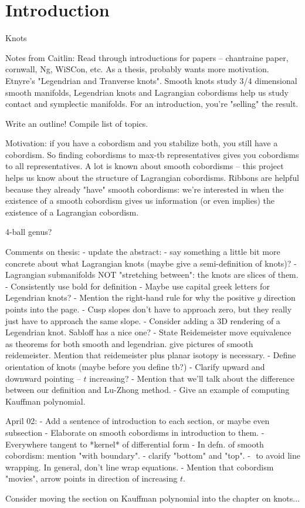 \chapter{Introduction}
Knots

Notes from Caitlin:
Read through introductions for papers -- chantraine paper, cornwall, Ng, WiSCon, etc.
As a thesis, probably wants more motivation. Etnyre's "Legendrian and Tranverse knots".
Smooth knots study 3/4 dimensional smooth manifolds, Legendrian knots and Lagrangian cobordisms help us study contact and symplectic manifolds. 
For an introduction, you're "selling" the result.

Write an outline!
Compile list of topics. 

Motivation: if you have a cobordism and you stabilize both, you still have a cobordism. So finding cobordisms to max-tb representatives gives you cobordisms to all representatives.
A lot is known about smooth cobordisms -- this project helps us know about the structure of Lagrangian cobordisms.
Ribbons are helpful because they already "have" smooth cobordisms: we're interested in when the existence of a smooth cobordism gives us information (or even implies) the existence of a Lagrangian cobordism.

4-ball genus? 

Comments on thesis: 
    - update the abstract:
        - say something a little bit more concrete about what Lagrangian knots (maybe give a semi-definition of knots)?
        - Lagrangian submanifolds NOT "stretching between": the knots are slices of them.
    - Consistently use bold for definition
    - Maybe use capital greek letters for Legendrian knots?
    - Mention the right-hand rule for why the positive $y$ direction points into the page.
    - Cusp slopes don't have to approach zero, but they really just have to approach the same slope.
    - Consider adding a 3D rendering of a Legendrian knot. Sabloff has a nice one?
    - State Reidemeister move equivalence as theorems for both smooth and legendrian. give pictures of smooth reidemeister. Mention that reidemeister plus planar isotopy is necessary. 
    - Define orientation of knots (maybe before you define tb?)
    - Clarify upward and downward pointing -- $t$ increasing?
    - Mention that we'll talk about the difference between our definition and Lu-Zhong method.
    - Give an example of computing Kauffman polynomial.

April 02:
    - Add a sentence of introduction to each section, or maybe even subsection
    - Elaborate on smooth cobordisms in introduction to them.
    - Everywhere tangent to *kernel* of differential form
    - In defn. of smooth cobordism: mention "with boundary".
    - clarify "bottom" and "top".
    - ${ }$ to avoid line wrapping. In general, don't line wrap equations.
    - Mention that cobordism "movies", arrow points in direction of increasing $t$.

Consider moving the section on Kauffman polynomial into the chapter on knots...
